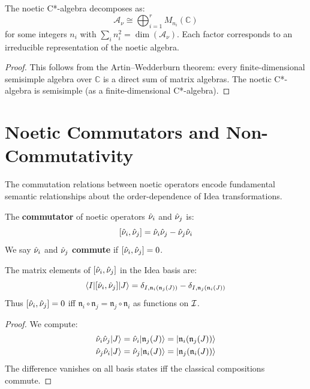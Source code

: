 \begin{theorem}
\label{thm:noetic-algebra-structure}
The noetic C*-algebra decomposes as:
\[
\mathcal{A}_\nu \cong \bigoplus_{i=1}^{r} M_{n_i}(\mathbb{C})
\]
for some integers $n_i$ with $\sum_i n_i^2 = \dim(\mathcal{A}_\nu)$. Each factor corresponds to an irreducible representation of the noetic algebra.
\end{theorem}

\begin{proof}
This follows from the Artin--Wedderburn theorem: every finite-dimensional semisimple algebra over $\mathbb{C}$ is a direct sum of matrix algebras. The noetic C*-algebra is semisimple (as a finite-dimensional C*-algebra).
\end{proof}

\section{Noetic Commutators and Non-Commutativity}
\label{sec:noetic-commutators}

The commutation relations between noetic operators encode fundamental semantic relationships about the order-dependence of Idea transformations.

\begin{definition}
\label{def:noetic-commutator}
The \textbf{commutator} of noetic operators $\hat{\nu}_i$ and $\hat{\nu}_j$ is:
\[
[\hat{\nu}_i, \hat{\nu}_j] = \hat{\nu}_i \hat{\nu}_j - \hat{\nu}_j \hat{\nu}_i
\]
We say $\hat{\nu}_i$ and $\hat{\nu}_j$ \textbf{commute} if $[\hat{\nu}_i, \hat{\nu}_j] = 0$.
\end{definition}

\begin{proposition}
\label{prop:commutator-elements}
The matrix elements of $[\hat{\nu}_i, \hat{\nu}_j]$ in the Idea basis are:
\[
\langle I|[\hat{\nu}_i, \hat{\nu}_j]|J\rangle = \delta_{I, \mathfrak{n}_i(\mathfrak{n}_j(J))} - \delta_{I, \mathfrak{n}_j(\mathfrak{n}_i(J))}
\]
Thus $[\hat{\nu}_i, \hat{\nu}_j] = 0$ iff $\mathfrak{n}_i \circ \mathfrak{n}_j = \mathfrak{n}_j \circ \mathfrak{n}_i$ as functions on $\mathcal{I}$.
\end{proposition}

\begin{proof}
We compute:
\begin{align}
\hat{\nu}_i \hat{\nu}_j |J\rangle &= \hat{\nu}_i |\mathfrak{n}_j(J)\rangle = |\mathfrak{n}_i(\mathfrak{n}_j(J))\rangle \\
\hat{\nu}_j \hat{\nu}_i |J\rangle &= \hat{\nu}_j |\mathfrak{n}_i(J)\rangle = |\mathfrak{n}_j(\mathfrak{n}_i(J))\rangle
\end{align}
The difference vanishes on all basis states iff the classical compositions commute.
\end{proof}

